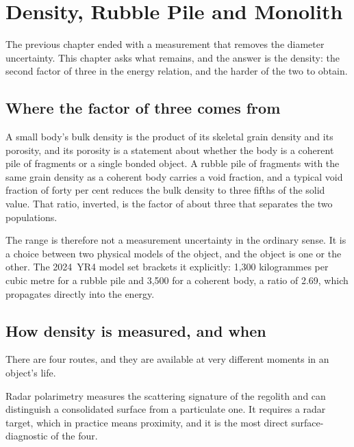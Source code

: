 
\chapter{Density, Rubble Pile and Monolith}
\label{ch:density}

The previous chapter ended with a measurement that removes the diameter
uncertainty. This chapter asks what remains, and the answer is the density:
the second factor of three in the energy relation, and the harder of the two
to obtain.

\section{Where the factor of three comes from}

A small body's bulk density is the product of its skeletal grain density and
its porosity, and its porosity is a statement about whether the body is a
coherent pile of fragments or a single bonded object. A rubble pile of
fragments with the same grain density as a coherent body carries a void
fraction, and a typical void fraction of forty per cent reduces the bulk
density to three fifths of the solid value. That ratio, inverted, is the
factor of about three that separates the two populations.

The range is therefore not a measurement uncertainty in the ordinary sense.
It is a choice between two physical models of the object, and the object is
one or the other. The 2024~YR4 model set brackets it explicitly: 1,300
kilogrammes per cubic metre for a rubble pile and 3,500 for a coherent body,
a ratio of 2.69, which propagates directly into the energy.

\section{How density is measured, and when}

There are four routes, and they are available at very different moments in
an object's life.

Radar polarimetry measures the scattering signature of the regolith and can
distinguish a consolidated surface from a particulate one. It requires a
radar target, which in practice means proximity, and it is the most direct
surface-diagnostic of the four.

